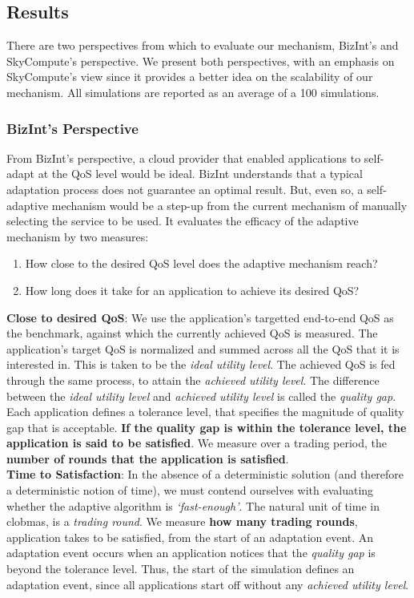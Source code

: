 \documentclass[10pt,journal,compsoc]{IEEEtran}
\begin{document}
\subsection{Results}
There are two perspectives from which to evaluate our mechanism, BizInt's and SkyCompute's perspective. We present both perspectives, with an emphasis on SkyCompute's view since it provides a better idea on the scalability of our mechanism. All simulations are reported as an average of a 100 simulations.\\
\subsubsection{BizInt's Perspective}
From BizInt's perspective, a cloud provider that enabled applications to self-adapt at the QoS level would be ideal. BizInt understands that a typical adaptation process does not guarantee an optimal result. But, even so, a self-adaptive mechanism would be a step-up from the current mechanism of manually selecting the service to be used. It evaluates the efficacy of the adaptive mechanism by two measures:
	\begin{enumerate}
		\item How close to the desired QoS level does the adaptive mechanism reach?
		\item How long does it take for an application to achieve its desired QoS?
	\end{enumerate}
\textbf{Close to desired QoS}: We use the application's targetted end-to-end QoS as the benchmark, against which the currently achieved QoS is measured. The application's target QoS is normalized and summed across all the QoS that it is interested in. This is taken to be the \textit{ideal utility level}. The achieved QoS is fed through the same process, to attain the \textit{achieved utility level}. The difference between the \textit{ideal utility level} and \textit{achieved utility level} is called the \textit{quality gap}. Each application defines a tolerance level, that specifies the magnitude of quality gap that is acceptable. \textbf{If the quality gap is within the tolerance level, the application is said to be satisfied}. We measure over a trading period, the \textbf{number of rounds that the application is satisfied}.\\

\textbf{Time to Satisfaction}: In the absence of a deterministic solution (and therefore a deterministic notion of time), we must contend ourselves with evaluating whether the adaptive algorithm is \textit{`fast-enough'}.  The natural unit of time in clobmas, is a \textit{trading round}.  We measure \textbf{how many trading rounds}, application takes to be satisfied, from the start of an adaptation event. An adaptation event occurs when an application notices that the \textit{quality gap} is beyond the tolerance level. Thus, the start of the simulation defines an adaptation event, since all applications start off without any \textit{achieved utility level}.
	
\end{document}
